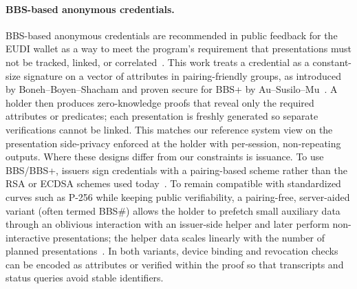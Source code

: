 \paragraph{BBS-based anonymous credentials.~\cite{baum2024cryptographers}}
BBS-based anonymous credentials are recommended in public feedback for the EUDI wallet as a way to meet the program’s requirement that presentations must not be tracked, linked, or correlated~\cite{baum2024cryptographers}.
This work treats a credential as a constant-size signature on a vector of attributes in pairing-friendly groups, as introduced by Boneh–Boyen–Shacham and proven secure for BBS+ by Au–Susilo–Mu~\cite{C:BonBoySha04,SCN:AuSusMu06}.
A holder then produces zero-knowledge proofs that reveal only the required attributes or predicates; each presentation is freshly generated so separate verifications cannot be linked.
This matches our reference system view on the presentation side-privacy enforced at the holder with per-session, non-repeating outputs.
Where these designs differ from our constraints is issuance. To use BBS/BBS+, issuers sign credentials with a pairing-based scheme rather than the RSA or ECDSA schemes used today~\cite{C:BonBoySha04,SCN:AuSusMu06}. To remain compatible with standardized curves such as P-256 while keeping public verifiability, a pairing-free, server-aided variant (often termed BBS\#) allows the holder to prefetch small auxiliary data through an oblivious interaction with an issuer-side helper and later perform non-interactive presentations; the helper data scales linearly with the number of planned presentations~\cite{cryptoeprint:2025/513}.
In both variants, device binding and revocation checks can be encoded as attributes or verified within the proof so that transcripts and status queries avoid stable identifiers.


